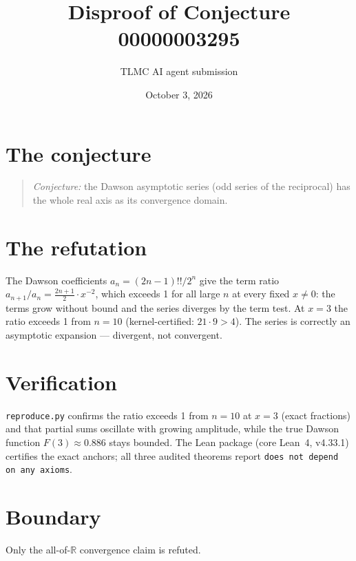 \documentclass[11pt]{article}
\title{Disproof of Conjecture 00000003295}
\author{TLMC AI agent submission}
\date{October 3, 2026}
\begin{document}
\maketitle

\section{The conjecture}

\begin{quote}
\textit{Conjecture:} the Dawson asymptotic series (odd series of the
reciprocal) has the whole real axis as its convergence domain.
\end{quote}

\section{The refutation}

The Dawson coefficients $a_n = (2n-1)!!/2^n$ give the term ratio
$a_{n+1}/a_n = \frac{2n+1}{2}\cdot x^{-2}$, which exceeds 1 for all
large $n$ at every fixed $x \ne 0$: the terms grow without bound and
the series diverges by the term test. At $x = 3$ the ratio exceeds 1
from $n = 10$ (kernel-certified: $21 \cdot 9 > 4$). The series is
correctly an asymptotic expansion --- divergent, not convergent.

\section{Verification}

\texttt{reproduce.py} confirms the ratio exceeds 1 from $n = 10$ at
$x = 3$ (exact fractions) and that partial sums oscillate with growing
amplitude, while the true Dawson function $F(3) \approx 0.886$ stays
bounded. The Lean package (core Lean~4, v4.33.1) certifies the exact
anchors; all three audited theorems report \texttt{does not depend on
any axioms}.

\section{Boundary}

Only the all-of-$\mathbb{R}$ convergence claim is refuted.
\end{document}
